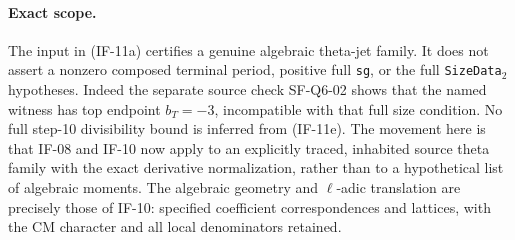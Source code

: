 \paragraph{Exact scope.}
The input in (IF-11a) certifies a genuine algebraic theta-jet family.
It does not assert a nonzero composed terminal period, positive full
\texttt{sg}, or the full \texttt{SizeData}$_2$ hypotheses.
Indeed the separate source check SF-Q6-02 shows that the named witness
has top endpoint $b_T=-3$, incompatible with that full size condition.
No full step-10 divisibility bound is inferred from (IF-11e).
The movement here is that IF-08 and IF-10 now apply to an explicitly
traced, inhabited source theta family with the exact derivative
normalization, rather than to a hypothetical list of algebraic moments.
The algebraic geometry and $\ell$-adic translation are precisely those
of IF-10: specified coefficient correspondences and lattices, with the
CM character and all local denominators retained.
